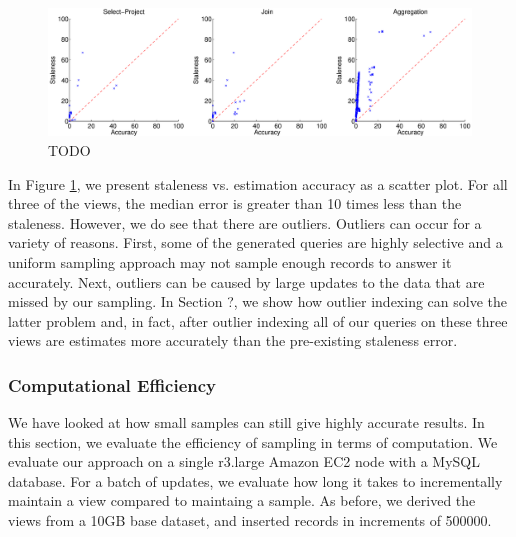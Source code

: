 \begin{figure}[h]
\label{exp3dist}
\centering
 \includegraphics[width=\textwidth]{exp/exp3-query-error-dist.eps}
 \caption{TODO}
\end{figure}

In Figure \ref{exp3dist}, we present staleness vs. estimation accuracy as a scatter plot.
For all three of the views, the median error is greater than 10 times less than the staleness. 
However, we do see that there are outliers.
Outliers can occur for a variety of reasons.
First, some of the generated queries are highly selective and a uniform sampling approach may not sample enough records to answer it accurately.
Next, outliers can be caused by large updates to the data that are missed by our sampling.
In Section ?, we show how outlier indexing can solve the latter problem and, in fact, after outlier indexing all of our queries on these three views are estimates more accurately than the pre-existing staleness error.

\subsubsection{Computational Efficiency}
We have looked at how small samples can still give highly accurate results.
In this section, we evaluate the efficiency of sampling in terms of computation.
We evaluate our approach on a single r3.large Amazon EC2 node with a MySQL database.
For a batch of updates, we evaluate how long it takes to incrementally maintain a view compared to maintaing a sample.
As before, we derived the views from a 10GB base dataset, and inserted records in increments of 500000.

